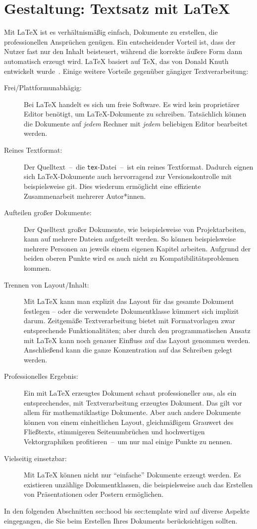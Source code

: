 \chapter{Gestaltung: Textsatz mit \LaTeX}
\label{chap:Textsatz}
%
Mit \LaTeX{} ist es verhältnismäßig einfach, Dokumente zu erstellen, die professionellen Ansprüchen genügen. Ein entscheidender Vorteil ist, dass der Nutzer fast nur den Inhalt beisteuert, während die korrekte äußere Form dann automatisch erzeugt wird. \LaTeX{} basiert auf \TeX{}, das von Donald Knuth entwickelt wurde~\cite{knuth:tex}. Einige weitere Vorteile gegenüber gängiger
Textverarbeitung:
\begin{description}
	\item[Frei/Plattformunabhägig:] Bei \LaTeX{} handelt es sich um freie 
	Software. Es wird kein proprietärer Editor benötigt, um \LaTeX{}-Dokumente
	zu schreiben. Tatsächlich können die Dokumente auf \emph{jedem} Rechner
	mit \emph{jedem} beliebigen Editor bearbeitet werden.
	\item[Reines Textformat:] Der Quelltext~--~die \texttt{tex}-Datei~--~ist
	ein reines Textformat. Dadurch eignen sich \LaTeX{}-Dokumente auch 
	hervorragend zur Versionskontrolle mit beispielsweise git. Dies wiederum
	ermöglicht eine effiziente Zusammenarbeit mehrerer Autor*innen.
	\item[Aufteilen großer Dokumente:] Der Quelltext großer Dokumente, wie 
	beispielsweise von Projektarbeiten, kann auf mehrere Dateien
	aufgeteilt werden. So können beispielsweise mehrere Personen an jeweils
	einem eigenen Kapitel arbeiten. Aufgrund der beiden oberen Punkte wird es 
	auch nicht zu Kompatibilitätsproblemen kommen.
	\item[Trennen von Layout/Inhalt:] Mit \LaTeX{} kann man explizit das
	Layout für das gesamte Dokument festlegen -- oder die verwendete 
	Dokumentklasse kümmert sich implizit darum. Zeitgemäße Textverarbeitung
	bietet mit Formatvorlagen zwar entsprechende Funktionalitäten; aber
	durch den programmatischen Ansatz mit \LaTeX{} kann noch genauer
	Einfluss auf das Layout genommen werden. Anschließend kann die ganze
	Konzentration auf das Schreiben gelegt werden.
	\item[Professionelles Ergebnis:] Ein mit \LaTeX{} erzeugtes Dokument
	schaut professioneller aus, als ein entsprechendes, mit Textverarbeitung
	erzeugtes Dokument. Das gilt vor allem für mathematiklastige Dokumente.
	Aber auch andere Dokumente können von einem einheitlichen 
	Layout, gleichmäßigem Grauwert des Fließtexts, stimmigeren Seitenumbrüchen 
	und hochwertigen Vektorgraphiken profitieren~--~um nur mal einige Punkte zu 
	nennen.
	\item[Vielseitig einsetzbar:] Mit \LaTeX{} können nicht nur 
	\enquote{einfache} Dokumente erzeugt werden. Es existieren unzählige
	Dokumentklassen, die beispielsweise auch das Erstellen von Präsentationen
	oder Postern ermöglichen.
\end{description}
\par
In den folgenden Abschnitten sec:hood bis sec:template wird auf diverse Aspekte eingegangen, die Sie beim Erstellen Ihres Dokuments berücksichtigen sollten.
%
%
